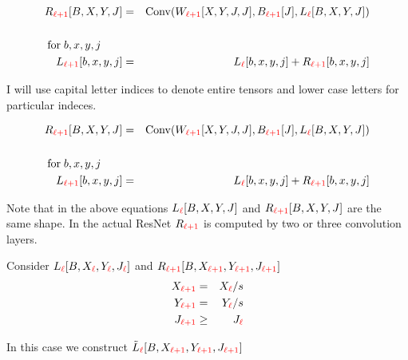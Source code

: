 {\medskip
\begin{eqnarray*}
R_{\color{red} \ell+1}[B,X,Y,J] & = & \mathrm{Conv}(W_{\color{red} \ell+1}[X,Y,J,J],B_{\color{red} \ell+1}[J],L_{\color{red} \ell}[B,X,Y,J]) \\
\\
\mathrm{for}\;b,x,y,j\;\;\;\;\;\;\;\\
L_{\color{red} \ell+1}[b,x,y,j] & = & L_{\color{red}\ell}[b,x,y,j] + R_{\color{red} \ell+1}[b,x,y,j]
\end{eqnarray*}

\vfill I will use capital letter indices to denote entire tensors and lower case letters for particular indeces.


\medskip
\begin{eqnarray*}
R_{\color{red} \ell+1}[B,X,Y,J] & = & \mathrm{Conv}(W_{\color{red} \ell+1}[X,Y,J,J],B_{\color{red} \ell+1}[J],L_{\color{red} \ell}[B,X,Y,J]) \\
\\
\mathrm{for}\;b,x,y,j\;\;\;\;\;\;\;\\
L_{\color{red} \ell+1}[b,x,y,j] & = & L_{\color{red}\ell}[b,x,y,j] + R_{\color{red} \ell+1}[b,x,y,j]
\end{eqnarray*}

\vfill Note that in the above equations $L_{\color{red} \ell}[B,X,Y,J]$ and $R_{\color{red} \ell+1}[B,X,Y,J]$ are the same shape.
\vfill
In the actual ResNet $R_{\color{red} \ell+1}$ is computed by two or three convolution layers.


Consider $L_{\color{red} \ell}[B,X_{\color{red} \ell},Y_{\color{red} \ell},J_{\color{red} \ell}]$ and $R_{\color{red} \ell+1}[B,X_{\color{red} \ell+1},Y_{\color{red} \ell+1},J_{\color{red} \ell+1}]$
\begin{eqnarray*}
X_{\color{red} \ell+1} & = & X_{\color{red} \ell}/s \\
Y_{\color{red} \ell+1} & = & Y_{\color{red} \ell}/s \\
J_{\color{red} \ell+1} & \geq &  J_{\color{red} \ell}
\end{eqnarray*}


\vfill
In this case we construct $\tilde{L}_{\color{red} \ell}[B,X_{\color{red} \ell +1},Y_{\color{red} \ell+1},J_{\color{red}\ell +1}]$

}
